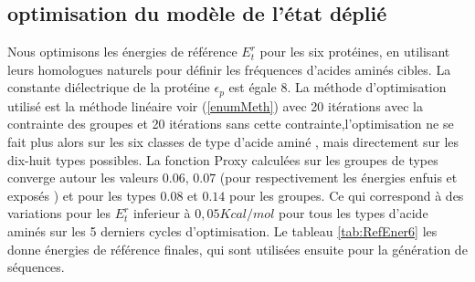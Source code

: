 \subsection{optimisation du modèle de l'état déplié}

Nous optimisons les énergies de référence $E_t^r$ pour les six protéines, en utilisant leurs homologues naturels pour définir les fréquences d'acides aminés cibles. La constante diélectrique de la protéine $\epsilon_p$ est égale $8$. La méthode d'optimisation utilisé est la méthode linéaire voir (\ref{enumMeth}) avec 20 itérations avec la contrainte des groupes et 20 itérations sans cette contrainte,l'optimisation ne se fait plus alors sur les six classes de type d'acide aminé , mais directement sur les dix-huit types possibles. La fonction Proxy calculées sur les groupes de types converge autour les valeurs $0.06$, $0.07$ (pour respectivement les énergies enfuis et exposés ) et pour les types $0.08$ et $0.14$ pour les groupes. Ce qui correspond à des variations  pour les $E_t^r$ inferieur à $0,05 Kcal/mol$ pour tous les types d'acide aminés sur les 5 derniers cycles d'optimisation. Le tableau \ref{tab:RefEner6} les donne énergies de référence finales, qui sont utilisées ensuite pour la génération de séquences.

